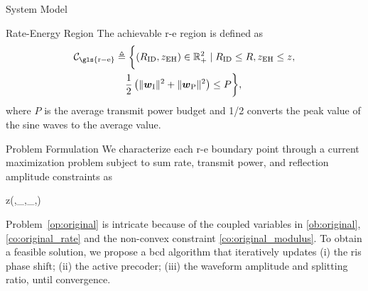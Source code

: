 \begin{section}{System Model}
	\begin{subsection}{Rate-Energy Region}
		The achievable \gls{r-e} region is defined as
		\begin{align}
			\mathcal{C}_{\mathrm{\gls{r-e}}}
			&\triangleq \biggl\{(R_{\mathrm{ID}}, z_{\mathrm{EH}}) \in \mathbb{R}_+^2 \mid R_{\mathrm{ID}} \le R, z_{\mathrm{EH}} \le z,\nonumber\\
			&\quad \frac{1}{2}\left(\lVert{\boldsymbol{w}_{\mathrm{I}}}\rVert^2+\lVert{\boldsymbol{w}_{\mathrm{P}}}\rVert^2\right) \le P\biggr\},
		\end{align}
		where $P$ is the average transmit power budget and 1/2 converts the peak value of the sine waves to the average value.
	\end{subsection}
\end{section}


\begin{section}{Problem Formulation}\label{se:problem_formulation}
	We characterize each \gls{r-e} boundary point through a current maximization problem subject to sum rate, transmit power, and reflection amplitude constraints as
	\begin{maxi!}
		{}{z(\boldsymbol{\phi},_{},_{},\rho)}{\label{op:original}}{\label{ob:original}}
		\label{co:original_rate}
		\label{co:original_power}
		\label{co:original_modulus}
	\end{maxi!}
	Problem~\eqref{op:original} is intricate because of the coupled variables in \eqref{ob:original}, \eqref{co:original_rate} and the non-convex constraint \eqref{co:original_modulus}. To obtain a feasible solution, we propose a \gls{bcd} algorithm that iteratively updates (i) the \gls{ris} phase shift; (ii) the active precoder; (iii) the waveform amplitude and splitting ratio, until convergence.



\end{section}

